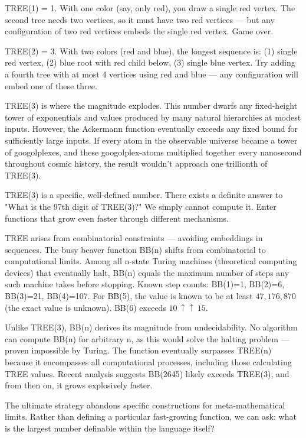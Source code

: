 TREE(1) = 1. With one color (say, only red), you draw a single red vertex. The second tree needs two vertices, so it must have two red vertices — but any configuration of two red vertices embeds the single red vertex. Game over.

TREE(2) = 3. With two colors (red and blue), the longest sequence is: (1) single red vertex, (2) blue root with red child below, (3) single blue vertex. Try adding a fourth tree with at most 4 vertices using red and blue — any configuration will embed one of these three.

TREE(3) is where the magnitude explodes. This number dwarfs any fixed-height tower of exponentials and values produced by many natural hierarchies at modest inputs. However, the Ackermann function eventually exceeds any fixed bound for sufficiently large inputs. If every atom in the observable universe became a tower of googolplexes, and these googolplex-atoms multiplied together every nanosecond throughout cosmic history, the result wouldn't approach one trillionth of TREE(3).

TREE(3) is a specific, well-defined number. There exists a definite answer to "What is the 97th digit of TREE(3)?" We simply cannot compute it. Enter functions that grow even faster through different mechanisms.

TREE arises from combinatorial constraints — avoiding embeddings in sequences. The busy beaver function BB(n) shifts from combinatorial to computational limits. Among all n-state Turing machines (theoretical computing devices) that eventually halt, BB(n) equals the maximum number of steps any such machine takes before stopping. Known step counts: BB(1)=1, BB(2)=6, BB(3)=21, BB(4)=107. For BB(5), the value is known to be at least $47{,}176{,}870$ (the exact value is unknown). BB(6) exceeds $10\,\uparrow\!\uparrow\,15$.

Unlike TREE(3), BB(n) derives its magnitude from undecidability. No algorithm can compute BB(n) for arbitrary n, as this would solve the halting problem — proven impossible by Turing. The function eventually surpasses TREE(n) because it encompasses all computational processes, including those calculating TREE values. Recent analysis suggests BB(2645) likely exceeds TREE(3), and from then on, it grows explosively faster.

The ultimate strategy abandons specific constructions for meta-mathematical limits. Rather than defining a particular fast-growing function, we can ask: what is the largest number definable within the language itself?


